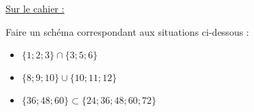 \documentclass{automatisme}
\begin{document}
\begin{frame}
	{\large\color{red}\uline{Sur le cahier :}}

	Faire un schéma correspondant aux situations ci-dessous : \bigskip
	\begin{itemize}
		\setlength{\itemsep}{2em}
		\item $\{ 1 ; 2 ; 3 \} ∩ \{ 3 ; 5 ; 6 \}$
		\item $\{ 8 ; 9 ; 10 \} ∪ \{ 10 ; 11 ; 12 \}$
		\item $\{ 36 ; 48 ; 60 \} ⊂ \{ 24 ; 36 ; 48 ; 60 ; 72 \}$
	\end{itemize}
\end{frame}
\end{document}
